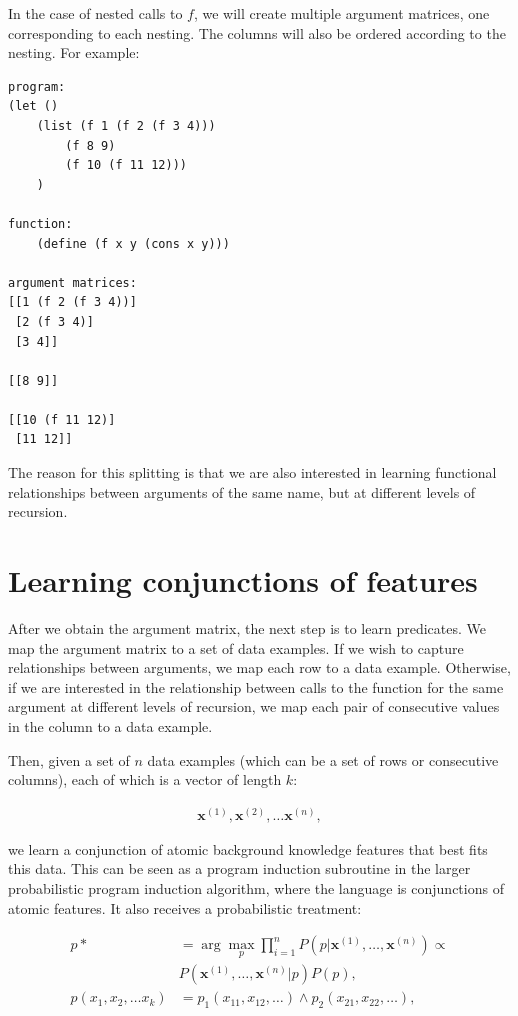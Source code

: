 \documentclass{acmsiggraph}
\begin{document}
In the case of nested calls to $f$,
we will create multiple argument matrices,
one corresponding to each nesting.
The columns will also be ordered according to the nesting.
For example:

\begin{lstlisting}
program:
(let ()
    (list (f 1 (f 2 (f 3 4)))
        (f 8 9)
        (f 10 (f 11 12)))
    )

function: 
    (define (f x y (cons x y)))

argument matrices: 
[[1 (f 2 (f 3 4))]
 [2 (f 3 4)]
 [3 4]]

[[8 9]]

[[10 (f 11 12)]
 [11 12]]

\end{lstlisting}

The reason for this splitting is that
we are also interested in learning functional relationships
between arguments of the same name,
but at different levels of recursion.

\section{Learning conjunctions of features}

After we obtain the argument matrix, the next step is to learn predicates.
We map the argument matrix to a set of data examples.
If we wish to capture relationships between arguments,
we map each row to a data example.
Otherwise, if we are interested in the relationship
between calls to the function for the same argument at different levels of recursion,
we map each pair of consecutive values in the column to a data example.

Then, given a set of $n$ data examples (which can be a set of rows or consecutive columns),
each of which is a vector of length $k$:

\newcommand{\EX}[1]{{\mathbf{x}^{(#1)}}}

\begin{align*}
\EX{1}, \EX{2}, \ldots \EX{n},
\end{align*}

we learn a conjunction of atomic background knowledge features that best fits this data.
This can be seen as a program induction subroutine in the larger probabilistic program induction algorithm,
where the language is conjunctions of atomic features.
It also receives a probabilistic treatment:

\begin{align*}
p* &= \arg \max_p \prod^n_{i = 1} P(p | \EX{1}, \ldots, \EX{n}) \propto \\
&P(\EX{1}, \ldots, \EX{n} | p) P(p),\\
p(x_1, x_2, \ldots x_k) &= p_1(x_{11}, x_{12}, \ldots) \wedge p_2(x_{21}, x_{22}, \ldots),
\end{align*}
\end{document}
